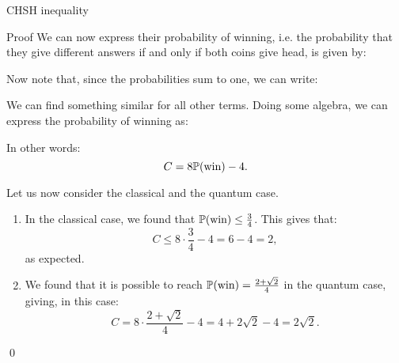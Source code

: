 \documentclass[a4paper]{article}
\begin{document}
\begin{parag}{CHSH inequality}
\begin{subparag}{Proof}
        We can now express their probability of winning, i.e. the probability that they give different answers if and only if both coins give head, is given by: 

        Now note that, since the probabilities sum to one, we can write:

        We can find something similar for all other terms. Doing some algebra, we can express the probability of winning as:

        In other words: 
        \[C = 8 \prob\left(\text{win}\right) - 4.\]

        Let us now consider the classical and the quantum case.
        \begin{enumerate}
            \item In the classical case, we found that $\prob\left(\text{win}\right) \leq \frac{3}{4}$. This gives that: 
            \[C \leq 8\cdot \frac{3}{4} - 4 = 6 - 4 = 2,\]
            as expected.
            \item We found that it is possible to reach $\prob\left(\text{win}\right) = \frac{2 + \sqrt{2}}{4}$ in the quantum case, giving, in this case: 
            \[C = 8\cdot \frac{2 + \sqrt{2}}{4} - 4 = 4 + 2\sqrt{2} - 4 = 2\sqrt{2}.\]
        \end{enumerate}
        
        \qed
    \end{subparag}
\end{parag}
\end{document}
